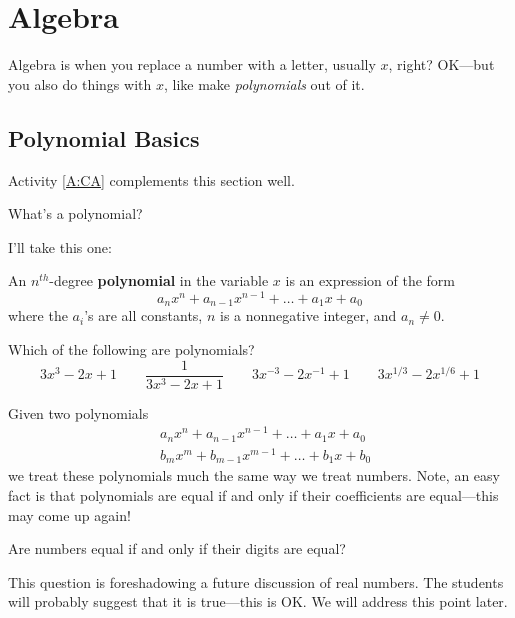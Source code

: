 \section{Algebra}



Algebra is when you replace a number with a letter, usually $x$,
right? OK---but you also do things with $x$, like make
\textit{polynomials} out of it.

\subsection{Polynomial Basics}

\begin{activitynote}
Activity \ref{A:CA} complements this section well.  %
\end{activitynote}



\begin{question} What's a polynomial? 
\end{question}
\QM

I'll take this one:
\begin{definition}
An $n^{th}$-degree \textbf{polynomial} in the variable $x$ is an expression of the form
\[
a_nx^n + a_{n-1}x^{n-1} + \dots + a_1 x + a_0
\]
where the $a_i$'s are all constants, $n$ is a nonnegative integer, and $a_n\neq 0$.
\end{definition}

\begin{question}
Which of the following are polynomials?
\[
3x^3 - 2x + 1 \qquad \frac{1}{3x^3 - 2x + 1} \qquad 3x^{-3} - 2x^{-1} + 1 \qquad 3x^{1/3} - 2x^{1/6} + 1
\]
\end{question}
\QM


Given two polynomials
\begin{align*}
&a_nx^n + a_{n-1}x^{n-1} + \dots + a_1 x + a_0 \\
&b_mx^m + b_{m-1}x^{m-1} + \dots + b_1 x + b_0
\end{align*}
we treat these polynomials much the same way we treat numbers. Note,
an easy fact is that polynomials are equal if and only if their
coefficients are equal---this may come up again!

\begin{question} Are numbers equal if and only if their digits are equal?
\end{question}
\QM

\begin{teachingnote}
This question is foreshadowing a future discussion of real numbers. The
students will probably suggest that it is true---this is OK. We will
address this point later.
\end{teachingnote}

